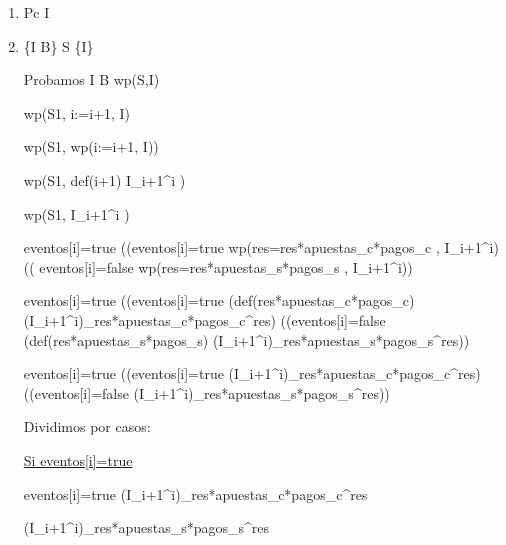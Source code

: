\documentclass[10pt,a4paper]{article}
\begin{document}
\vspace{5mm}

\begin{enumerate}
    \item Pc \implica \hspace{2} I
    
    \item{\{I \wedge B\} S \{I\}}
    \vspace{2mm}

    Probamos I \wedge B \implica wp(S,I)
    \vspace{2mm}

    wp(S1, i:=i+1, I)
    \vspace{2mm}
    
    \equiv wp(S1, wp(i:=i+1, I))
    \vspace{2mm}
    
    \equiv wp(S1, def(i+1) \yLuego I_{i+1}^i )
    \vspace{2mm}

    \equiv wp(S1, I_{i+1}^i )
    \vspace{2mm}

    \equiv eventos[i]=true \yLuego ((eventos[i]=true \wedge wp(res=res*apuestas_c*pagos_c , I_{i+1}^i) \vee (( eventos[i]=false \wedge wp(res=res*apuestas_s*pagos_s , I_{i+1}^i))
    \vspace{2mm}

    \equiv eventos[i]=true \yLuego ((eventos[i]=true \wedge (def(res*apuestas_c*pagos_c) \yLuego (I_{i+1}^i)_{res*apuestas_c*pagos_c}^{res}) \vee ((eventos[i]=false \wedge (def(res*apuestas_s*pagos_s) \yLuego (I_{i+1}^i)_{res*apuestas_s*pagos_s}^{res}))
    \vspace{2mm}

    \equiv eventos[i]=true \yLuego ((eventos[i]=true \yLuego (I_{i+1}^i)_{res*apuestas_c*pagos_c}^{res}) \vee ((eventos[i]=false \yLuego (I_{i+1}^i)_{res*apuestas_s*pagos_s}^{res}))
    \vspace{2mm}

    Dividimos por casos:
    \vspace{2mm}

    
    \underline{Si eventos[i]=true}
    \vspace{2mm}

    eventos[i]=true \wedge (I_{i+1}^i)_{res*apuestas_c*pagos_c}^{res}
    \vspace{2mm}

    \equiv (I_{i+1}^i)_{res*apuestas_s*pagos_s}^{res}
    \vspace{2mm}
    

\end{enumerate}
\end{document}
